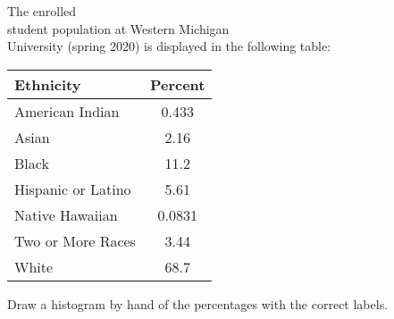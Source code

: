 \documentclass[11pt]{book}\usepackage[]{graphicx}\usepackage[]{color}
\begin{document}
\begin{exercises}
\begin{exercise}
  \end{exercise}
  \vspace{2mm}
%
%
%
\begin{exercise}   %

The enrolled \\ student population  at Western  Michigan  \\ University (spring 2020) is displayed in the  following table:

{\footnotesize{
  \begin{table}[htbp]
   \centering
  \begin{tabular}{@{} lc @{}} \hline %
    Ethnicity & Percent \\ \hline
    American Indian  & 0.433  \\
    Asian & 2.16 \\
    Black  & 11.2 \\
    Hispanic or Latino & 5.61 \\
    Native Hawaiian & 0.0831 \\
    Two or More Races & 3.44 \\
    White & 68.7 \\ \hline
   \end{tabular}
   \end{table}
}}

Draw a histogram by hand of the percentages with the correct labels.

\end{exercise}







\end{exercises}
\end{document}
